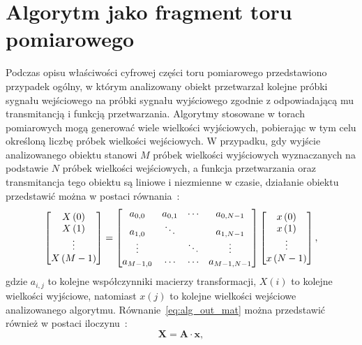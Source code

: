 \section{Algorytm jako fragment toru pomiarowego}

Podczas opisu właściwości cyfrowej części toru pomiarowego przedstawiono przypadek ogólny, w którym analizowany obiekt przetwarzał kolejne próbki sygnału wejściowego na próbki sygnału wyjściowego zgodnie z odpowiadającą mu transmitancją i funkcją przetwarzania. Algorytmy stosowane w torach pomiarowych mogą generować wiele wielkości wyjściowych, pobierając w tym celu określoną liczbę próbek wielkości wejściowych. W przypadku, gdy wyjście analizowanego obiektu stanowi $M$ próbek wielkości wyjściowych wyznaczanych na podstawie $N$ próbek wielkości wejściowych, a funkcja przetwarzania oraz transmitancja tego obiektu są liniowe i niezmienne w czasie, działanie obiektu przedstawić można w postaci równania~\cite{jakubiec_algorithms, jakubiec_single}:
\begin{equation}
\begin{bmatrix}
X \left(0\right)   \\
X \left(1\right)   \\
\vdots      \\
X \left(M-1\right)
\end{bmatrix}
=
\begin{bmatrix}
a_{0, 0}   &   a_{0, 1} &   \cdots   &   a_{0, N-1}      \\
a_{1, 0}   &   \ddots   &            &   a_{1, N-1}      \\
\vdots     &            &   \ddots   &   \vdots          \\
a_{M-1, 0} &   \cdots   &   \cdots   &   a_{M-1, N-1}
\end{bmatrix}
\begin{bmatrix}
x \left(0\right)   \\
x \left(1\right)   \\
\vdots      \\
x \left(N-1\right)
\end{bmatrix}
\label{eq:alg_out_mat},
\end{equation}
gdzie $a_{i,j}$ to kolejne współczynniki macierzy transformacji, $X(i)$ to kolejne wielkości wyjściowe, natomiast $x(j)$ to kolejne wielkości wejściowe analizowanego algorytmu. Równanie~\eqref{eq:alg_out_mat} można przedstawić również w postaci iloczynu~\cite{jakubiec_algorithms}:
\begin{equation}
\mathbf{X} = \mathbf{A} \cdot \mathbf{x} \label{eq:alg_out_mul},
\end{equation}

